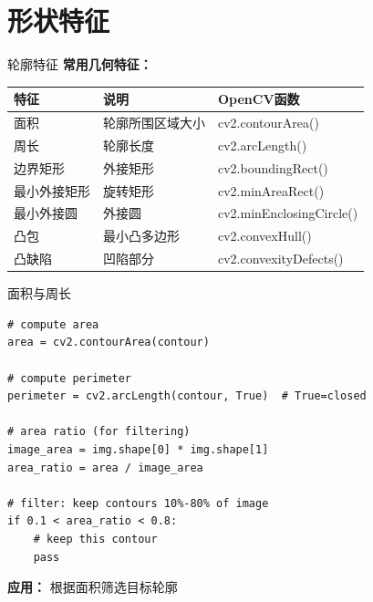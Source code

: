 
\section{形状特征}

\begin{frame}{轮廓特征}
    \textbf{常用几何特征：}
    \begin{table}
        \centering
        \small
        \begin{tabular}{lp{5cm}l}
            \toprule
            \textbf{特征} & \textbf{说明} & \textbf{OpenCV函数} \\
            \midrule
            面积 & 轮廓所围区域大小 & cv2.contourArea() \\
            周长 & 轮廓长度 & cv2.arcLength() \\
            边界矩形 & 外接矩形 & cv2.boundingRect() \\
            最小外接矩形 & 旋转矩形 & cv2.minAreaRect() \\
            最小外接圆 & 外接圆 & cv2.minEnclosingCircle() \\
            凸包 & 最小凸多边形 & cv2.convexHull() \\
            凸缺陷 & 凹陷部分 & cv2.convexityDefects() \\
            \bottomrule
        \end{tabular}
    \end{table}
\end{frame}

\begin{frame}[fragile]{面积与周长}
    \begin{lstlisting}[basicstyle=\ttfamily\scriptsize]
# compute area
area = cv2.contourArea(contour)

# compute perimeter
perimeter = cv2.arcLength(contour, True)  # True=closed

# area ratio (for filtering)
image_area = img.shape[0] * img.shape[1]
area_ratio = area / image_area

# filter: keep contours 10%-80% of image
if 0.1 < area_ratio < 0.8:
    # keep this contour
    pass
    \end{lstlisting}

    \vspace{0.2cm}

    \textbf{应用：} 根据面积筛选目标轮廓

\end{frame}

